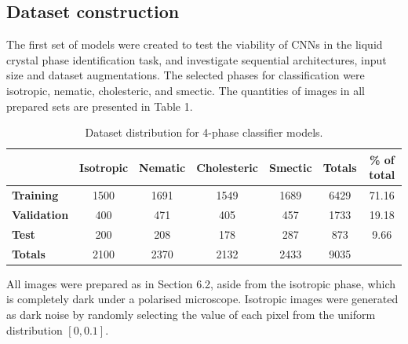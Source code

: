 \documentclass[12pt]{article}
\begin{document}
\subsection{Dataset construction}
The first set of models were created to test the viability of CNNs in the liquid crystal phase identification task, and investigate sequential architectures, input size and dataset augmentations. The selected phases for classification were isotropic, nematic, cholesteric, and smectic. The quantities of images in all prepared sets are presented in Table 1.
\begin{table}[h]
\begin{center}
\caption{Dataset distribution for 4-phase classifier models.}
\begin{tabular}{l|c|c|c|c|c|c}
\toprule
& \textbf{Isotropic} & \textbf{Nematic} & \textbf{Cholesteric} & \textbf{Smectic} & \textbf{Totals} & \textbf{\% of total}\\
\midrule
\textbf{Training} & 1500 & 1691 & 1549 & 1689 & 6429 & 71.16\\
\textbf{Validation} & 400 & 471 & 405 & 457 & 1733 & 19.18\\
\textbf{Test} & 200 & 208 & 178 & 287 & 873 & 9.66\\
\midrule
\textbf{Totals} & 2100 & 2370 & 2132 & 2433 & 9035\\
\bottomrule
\end{tabular}
\end{center}
\end{table}
All images were prepared as in Section 6.2, aside from the isotropic phase, which is completely dark under a polarised microscope. Isotropic images were generated as dark noise by randomly selecting the value of each pixel from the uniform distribution $[0,0.1]$.
\end{document}

